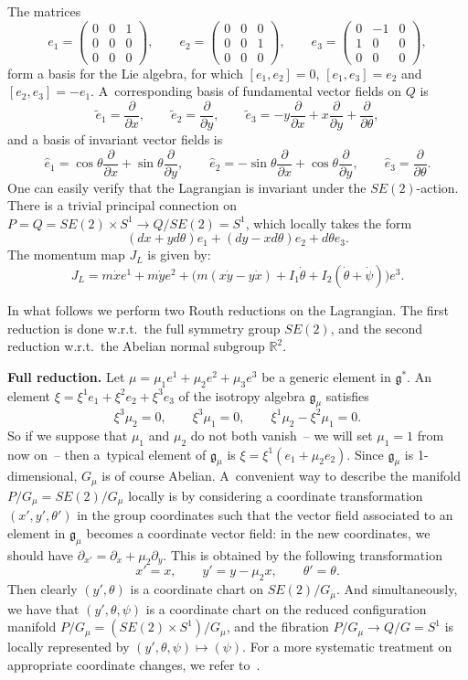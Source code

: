 \documentclass[pdftex]{sigma}
\newcommand{\R}{\mathbb{R}}
\newcommand{\lag}{\mathfrak{g}}
\def\fpd#1#2{\frac{\partial #1}{\partial #2}}
\begin{document}
The matrices
\[
e_1=  \begin{pmatrix} 0 & 0 & 1 \\
0 &0& 0 \\ 0&0&0\end{pmatrix}, \qquad
e_2=  \begin{pmatrix} 0 & 0 & 0 \\
0 &0& 1 \\ 0&0&0\end{pmatrix}, \qquad
e_3=  \begin{pmatrix} 0 & -1 & 0 \\
1 &0& 0 \\ 0&0&0\end{pmatrix},
\]
form a basis for the Lie algebra, for which $[e_1,e_2]=0$,
$[e_1,e_3]=e_2$ and $[e_2,e_3]=-e_1$.  A~corresponding basis of fundamental vector f\/ields on $Q$ is
\[
{\tilde e}_1 = \fpd{}{x}, \qquad {\tilde e}_2 = \fpd{}{y}, \qquad
{\tilde e}_3 = - y\fpd{}{x}+x\fpd{}{y} +\fpd{}{\theta},
\]
and a basis of invariant vector f\/ields is
\[
{\hat e}_1 = \cos\theta\fpd{}{x}+\sin\theta\fpd{}{y}, \qquad {\hat
e}_2 = -\sin\theta\fpd{}{x}+\cos\theta \fpd{}{y} , \qquad {\hat e}_3
= \fpd{}{\theta}.
\]
One can easily verify that the Lagrangian is invariant under the $SE(2)$-action. There is a trivial
principal connection on $P=Q=SE(2)\times S^1\to Q/SE(2)=S^1$, which locally takes the form
\[
(dx+yd\theta) e_1 + (dy -x d\theta) e_2 + d\theta e_3.
\]
The momentum map $J_L$ is given by:
\[
J_L= m\dot x e^1 + m \dot ye^2 +\big(m (x\dot y - y \dot x) +I_1\dot \theta + I_2(\dot \theta+\dot \psi)\big) e^3.
\]

In what follows we perform two Routh reductions on  the Lagrangian. The f\/irst reduction is done w.r.t.\ the full symmetry group $SE(2)$, and the second reduction w.r.t.\ the Abelian normal subgroup $\R^2$.

{\bf Full reduction.} Let $\mu=\mu_1e^1+\mu_2e^2+\mu_3e^3$ be a generic element in $\lag^*$. An element $\xi=\xi^1e_1+\xi^2e_2+\xi^3e_3$ of the isotropy algebra
$\lag_\mu$ satisf\/ies
\[
\xi^3\mu_2 =0, \qquad \xi^3\mu_1 =0, \qquad
\xi^1\mu_2-\xi^2\mu_1 =0.
\]
So if we suppose that $\mu_1$ and $\mu_2$ do not both vanish~-- we will set $\mu_1=1$  from now on~-- then a~typical element of $\lag_\mu$ is $\xi= \xi^1(e_1+\mu_2 e_2)$. Since $\lag_\mu$ is
1-dimensional, $G_\mu$ is of course Abelian. A~convenient way to describe the manifold $P/G_\mu=SE(2)/G_\mu$ locally is by considering a coordinate transformation $(x',y',\theta')$ in the group coordinates such that the vector f\/ield associated to an element in $\lag_\mu$ becomes a coordinate vector f\/ield: in the new coordinates, we should have $\partial_{x'}=\partial_{x}+\mu_2\partial_{y}$.
 This is obtained by the following transformation
\[
x'=x, \qquad y'= y-\mu_2 x, \qquad \theta'=\theta.
\]
Then clearly $(y',\theta)$ is a coordinate chart on $SE(2)/G_\mu$. And simultaneously, we have that $(y',\theta,\psi)$ is a coordinate chart on the reduced conf\/iguration manifold $P/G_\mu = (SE(2)\times S^1)/G_\mu$, and the f\/ibration $P/G_\mu \to Q/G=S^1$ is locally represented by $(y',\theta,\psi)\mapsto (\psi)$. For a more systematic treatment on appropriate coordinate changes, we refer to~\cite{mestcram}.
\end{document}
